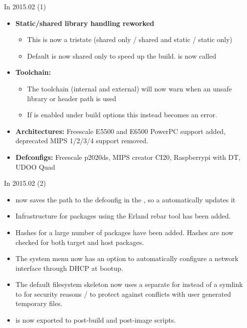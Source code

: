 \begin{frame}{In 2015.02 (1)}
  \begin{itemize}
  \item {\bf Static/shared library handling reworked}
    \begin{itemize}
    \item This is now a tristate (shared only / shared and static /
      static only)
    \item Default is now shared only to speed up the
      build.  is now called
    \end{itemize}
  \item {\bf Toolchain:}
    \begin{itemize}
    \item The toolchain (internal and external) will now warn when an
      unsafe library or header path is used
    \item If  is enabled under
      build options this instead becomes an error.
    \end{itemize}
  \item {\bf Architectures:} Freescale E5500 and E6500 PowerPC support
    added, deprecated MIPS 1/2/3/4 support removed.
  \item {\bf Defconfigs:} Freescale p2020ds, MIPS creator CI20,
    Raspberrypi with DT, UDOO Quad
  \end{itemize}
\end{frame}

\begin{frame}{In 2015.02 (2)}
  \begin{itemize}
  \item {} now saves the path to the
    defconfig in the , so a 
    automatically updates it
  \item Infrastructure for packages using the Erland rebar tool has
    been added.
  \item Hashes for a large number of packages have been added. Hashes
    are now checked for both target and host packages.
  \item The system menu now has an option to automatically configure a
    network interface through DHCP at bootup.
  \item The default filesystem skeleton now uses a separate
     for  instead of a symlink to 
    for security reasons / to protect against conflicts with user
    generated temporary files.
  \item {} is now exported to post-build and
    post-image scripts.
  \end{itemize}
\end{frame}

